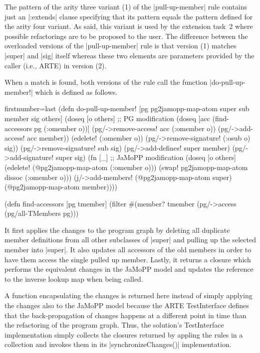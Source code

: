 \documentclass[submission]{eptcs}
\newcommand{\code}{\clojureinline}
\begin{document}
The pattern of the arity three variant (1) of the \code|pull-up-member| rule
contains just an \code|:extends| clause specifying that its pattern equals the
pattern defined for the arity four variant.  As said, this variant is used by
the extension task~2 where possible refactorings are to be proposed to the
user.  The difference between the overloaded versions of the
\code|pull-up-member| rule is that version (1) matches \code|super| and
\code|sig| itself whereas these two elements are parameters provided by the
caller (i.e., ARTE) in version (2).

When a match is found, both versions of the rule call the function
\code|do-pull-up-member!| which is defined as follows.

\begin{clojurecode*}{firstnumber=last}
(defn do-pull-up-member! [pg pg2jamopp-map-atom super sub member sig others]
  (doseq [o others]                                                 ;; PG modification
    (doseq [acc (find-accessors pg (:omember o))]
      (pg/->remove-access! acc (:omember o))
      (pg/->add-access! acc member))
    (edelete! (:omember o))
    (pg/->remove-signature! (:osub o) sig))
  (pg/->remove-signature! sub sig)
  (pg/->add-defines! super member)
  (pg/->add-signature! super sig)
  (fn [_]                                                           ;; JaMoPP modification
    (doseq [o others]
      (edelete! (@pg2jamopp-map-atom (:omember o)))
      (swap! pg2jamopp-map-atom dissoc (:omember o)))
    (j/->add-members! (@pg2jamopp-map-atom super) (@pg2jamopp-map-atom member))))

(defn find-accessors [pg tmember]
  (filter #(member? tmember (pg/->access %
          (pg/all-TMembers pg)))
\end{clojurecode*}

It first applies the changes to the program graph by deleting all duplicate
member definitions from all other subclasses of \code|super| and pulling up the
selected member into \code|super|.  It also updates all accessors of the old
members in order to have them access the single pulled up member.  Lastly, it
returns a closure which performs the equivalent changes in the JaMoPP model and
updates the reference to the inverse lookup map when being called.

A function encapsulating the changes is returned here instead of simply
applying the changes also to the JaMoPP model because the ARTE
\textsf{TestInterface} defines that the back-propagation of changes happens at
a different point in time than the refactoring of the program graph.  Thus, the
solution's \textsf{TestInterface} implementation simply collects the closures
returned by appling the rules in a collection and invokes them in its
\code|synchronizeChanges()| implementation.
\end{document}
